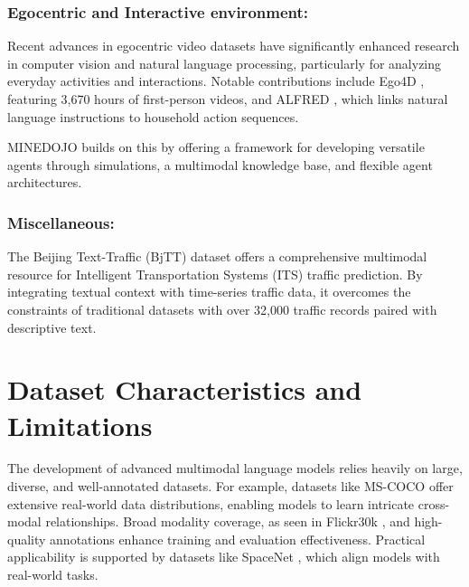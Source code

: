 \documentclass[runningheads]{llncs}
\begin{document}
\subsubsection{Egocentric and Interactive environment:}

Recent advances in egocentric video datasets have significantly enhanced research in computer vision and natural language processing, particularly for analyzing everyday activities and interactions. Notable contributions include Ego4D \cite{ref86}, featuring 3,670 hours of first-person videos, and ALFRED \cite{ref87}, which links natural language instructions to household action sequences. 

MINEDOJO \cite{ref88} builds on this by offering a framework for developing versatile agents through simulations, a multimodal knowledge base, and flexible agent architectures.  
        

\subsubsection{Miscellaneous:}
The Beijing Text-Traffic (BjTT) dataset \cite{ref91} offers a comprehensive multimodal resource for Intelligent Transportation Systems (ITS) traffic prediction. By integrating textual context with time-series traffic data, it overcomes the constraints of traditional datasets with over 32,000 traffic records paired with descriptive text.


\section{ Dataset Characteristics and Limitations}
The development of advanced multimodal language models relies heavily on large, diverse, and well-annotated datasets. For example, datasets like MS-COCO \cite{ref110} offer extensive real-world data distributions, enabling models to learn intricate cross-modal relationships. Broad modality coverage, as seen in Flickr30k \cite{ref105}, and high-quality annotations enhance training and evaluation effectiveness. Practical applicability is supported by datasets like SpaceNet \cite{ref102}, which align models with real-world tasks. 
\end{document}
